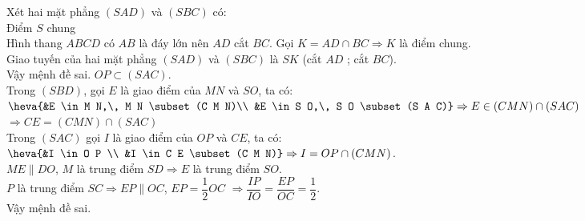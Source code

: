 \begin{ex}
{\begin{itemchoice}
			\itemch Xét hai mặt phẳng $\left(SAD\right)$ và $\left(SBC\right)$ có:\\
			Điểm $S$ chung\\
			Hình thang $ABCD$ có $AB$ là đáy lớn nên $AD$ cắt $BC$. Gọi $K=AD\cap BC\Rightarrow K$ là điểm chung.\\
			Giao tuyến của hai mặt phẳng $\left(SAD\right)$ và $\left(SBC\right)$ là $SK$ (cắt $AD$ ; cắt $BC$).\\
			Vậy mệnh đề sai.
			\itemch $O P \subset(S A C)$.\\
			Trong $(S B D)$, gọi $E$ là giao điểm của $M N$ và $S O$, ta có:\\
			$\heva{&E \in M N,\, M N \subset(C M N)\\
				&E \in S O,\, S O \subset(S A C)}\Rightarrow E \in(C M N) \cap(S A C)$\\
			$\Rightarrow C E=(C M N) \cap(S A C)$\\
			Trong $(S A C)$ gọi $I$ là giao điểm của $O P$ và $C E$, ta có:\\
			$\heva{&I \in O P \\
				&I \in C E \subset(C M N)}
			\Rightarrow I=O P \cap(C M N)$.\\
			$M E \parallel D O$, $M$ là trung điểm $S D \Rightarrow E$ là trung điểm $S O$.\\
			$P$ là trung điểm $S C \Rightarrow E P \parallel O C$, $E P=\dfrac{1}{2} O C$
			$\Rightarrow \dfrac{I P}{I O}=\dfrac{E P}{O C}=\dfrac{1}{2}$.\\
			Vậy mệnh đề sai.
		\end{itemchoice}
	}
\end{ex}

